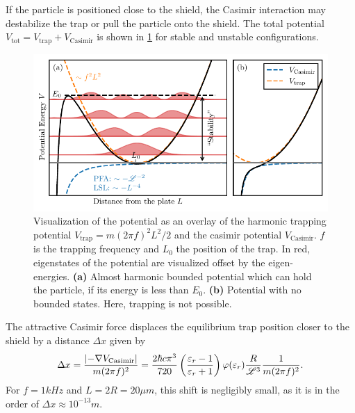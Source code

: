 If the particle is positioned close to the shield, the Casimir interaction may destabilize the trap or pull the particle onto the shield. The total potential $V_\mathrm{tot}=V_\mathrm{trap} + V_\mathrm{Casimir}$ is shown in \cref{fig:4:trap-eigenstates} for stable and unstable configurations.
\begin{figure}[!htbp]
  \centering
  \includegraphics[width=\textwidth]{./../figures/others/trapping-potential-eigenstates.pdf}
  \caption{Visualization of the potential as an overlay of the harmonic trapping potential $V_\mathrm{trap} = m (2\pi f)^2 L^2 / 2$ and the casimir potential $V_\mathrm{Casimir}$. $f$ is the trapping frequency and $L_0$ the position of the trap. In red, eigenstates of the potential are visualized offset by the eigen-energies.
  \textbf{(a)} Almost harmonic bounded potential which can hold the particle, if its energy is less than $E_0$.
  \textbf{(b)} Potential with no bounded states. Here, trapping is not possible.}
  \label{fig:4:trap-eigenstates}
\end{figure}
The attractive Casimir force displaces the equilibrium trap position closer to the shield by a distance $\Delta x$ given by
\begin{equation}
  \Delta x = \frac{\left\lvert-\nabla V_\mathrm{Casimir}\right\rvert}{m (2\pi f)^2} = \frac{2 \hbar c \pi^3}{720} \left(\frac{\varepsilon_r - 1}{\varepsilon_r + 1}\right) \varphi(\varepsilon_r) \frac{R}{\mathscr{L}^3} \frac{1}{m (2\pi f)^2} .
\end{equation}
For $f=1\si{kHz}$ and $L = 2R = 20\si{\mu m}$, this shift is negligibly small, as it is in the order of $\Delta x \approx 10^{-13}\si{m}$.

